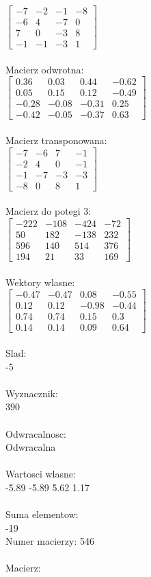 \documentclass[a4paper,12pt]{article}
\begin{document}
$\begin{bmatrix} -7&-2&-1&-8\\-6&4&-7&0\\7&0&-3&8\\-1&-1&-3&1 \end{bmatrix}$
\\
\\
Macierz odwrotna:\\

$\begin{bmatrix} 0.36&0.03&0.44&-0.62\\0.05&0.15&0.12&-0.49\\-0.28&-0.08&-0.31&0.25\\-0.42&-0.05&-0.37&0.63 \end{bmatrix}$
\\
\\
Macierz transponowana:\\

$\begin{bmatrix} -7&-6&7&-1\\-2&4&0&-1\\-1&-7&-3&-3\\-8&0&8&1 \end{bmatrix}$
\\
\\
Macierz do potegi 3:\\

$\begin{bmatrix} -222&-108&-424&-72\\50&182&-138&232\\596&140&514&376\\194&21&33&169 \end{bmatrix}$
\\
\\
Wektory wlasne:\\

$\begin{bmatrix} -0.47&-0.47&0.08&-0.55\\0.12&0.12&-0.98&-0.44\\0.74&0.74&0.15&0.3\\0.14&0.14&0.09&0.64 \end{bmatrix}$
\\
\\
Slad:\\
-5
\\
\\
Wyznacznik:\\
390
\\
\\
Odwracalnosc:\\
Odwracalna
\\
\\
Wartosci wlasne:\\
-5.89 -5.89 5.62 1.17
\\
\\
Suma elementow:\\
-19
\\
\newpage
Numer macierzy:
546
\\
\\
Macierz:\\
\end{document}
